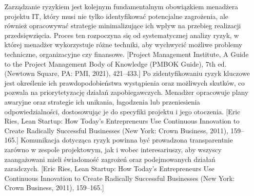 Zarządzanie ryzykiem jest kolejnym fundamentalnym obowiązkiem menadżera projektu IT, który musi nie tylko identyfikować potencjalne zagrożenia, ale również opracowywać strategie minimalizujące ich wpływ na przebieg realizacji przedsięwzięcia. Proces ten rozpoczyna się od systematycznej analizy ryzyk, w której menadżer wykorzystuje różne techniki, aby wychwycić możliwe problemy techniczne, organizacyjne czy finansowe. [Project Management Institute, A Guide to the Project Management Body of Knowledge (PMBOK Guide), 7th ed. (Newtown Square, PA: PMI, 2021), 421–433.] Po zidentyfikowaniu ryzyk kluczowe jest określenie ich prawdopodobieństwa wystąpienia oraz możliwych skutków, co pozwala na priorytetyzację działań zapobiegawczych. Menadżer opracowuje plany awaryjne oraz strategie ich unikania, łagodzenia lub przeniesienia odpowiedzialności, dostosowując je do specyfiki projektu i jego otoczenia. [Eric Ries, Lean Startup: How Today's Entrepreneurs Use Continuous Innovation to Create Radically Successful Businesses (New York: Crown Business, 2011), 159–165.] Komunikacja dotycząca ryzyk powinna być prowadzona transparentnie zarówno w zespole projektowym, jak i wobec interesariuszy, aby wszyscy zaangażowani mieli świadomość zagrożeń oraz podejmowanych działań zaradczych. [Eric Ries, Lean Startup: How Today's Entrepreneurs Use Continuous Innovation to Create Radically Successful Businesses (New York: Crown Business, 2011), 159–165.]

